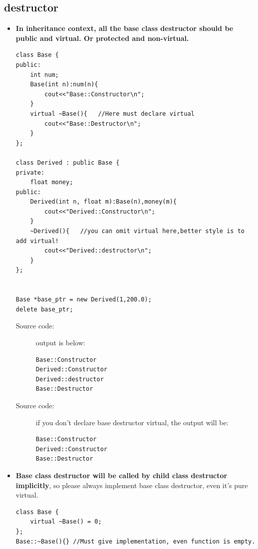 \documentclass[a4paper,11pt,twoside]{book}
\begin{document}
\subsection{destructor}
\begin{itemize}
	\item \textbf{In inheritance context, all the base class destructor should be public and virtual. Or protected and non-virtual.}  

\begin{lstlisting}[numbers=none]
class Base {
public:
	int num;
	Base(int n):num(n){
		cout<<"Base::Constructor\n";
	}
	virtual ~Base(){   //Here must declare virtual
		cout<<"Base::Destructor\n";
	}
};

class Derived : public Base {
private:
	float money;
public:
	Derived(int n, float m):Base(n),money(m){
		cout<<"Derived::Constructor\n";
	}
	~Derived(){   //you can omit virtual here,better style is to add virtual!
		cout<<"Derived::destructor\n";
	}
};


Base *base_ptr = new Derived(1,200.0);
delete base_ptr;
\end{lstlisting}

\begin{description}
	\item[Source code:] output is below: 
\begin{verbatim}
Base::Constructor                                                                                               
Derived::Constructor
Derived::destructor                                                                        
Base::Destructor 
\end{verbatim}
		\item[Source code:] if you don't declare base destructor virtual, the output will be:
\begin{verbatim}
Base::Constructor                                                                                               
Derived::Constructor                                                                        
Base::Destructor 
\end{verbatim}
	
\end{description}

	\item \textbf{Base class destructor will be called by child class destructor implicitly}, so please always implement base class destructor, even it's pure virtual. 
\begin{lstlisting}[numbers=none]
class Base {
	virtual ~Base() = 0;
};
Base::~Base(){} //Must give implementation, even function is empty. 
\end{lstlisting}	
	

\end{itemize}
\end{document}
